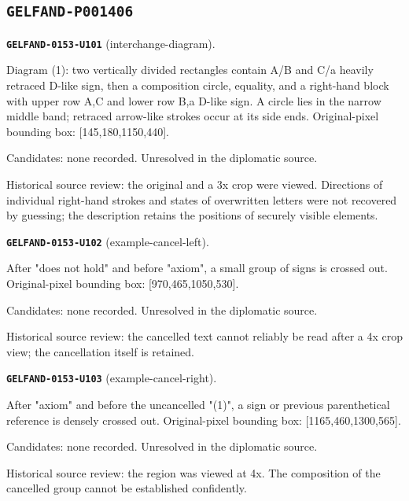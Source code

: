 \subsection*{\texttt{GELFAND-P001406}}
\par\noindent\leavevmode{}\label{GELFAND-0153-U101}\textbf{\texttt{GELFAND-0153-U101}} (interchange-diagram).\nopagebreak[4]\par
Diagram (1): two vertically divided rectangles contain A/B and C/a heavily retraced D-like sign, then a composition circle, equality, and a right-hand block with upper row A,C and lower row B,a D-like sign. A circle lies in the narrow middle band; retraced arrow-like strokes occur at its side ends. Original-pixel bounding box: [145,180,1150,440].\par
Candidates: none recorded. Unresolved in the diplomatic source.\par
Historical source review: the original and a 3x crop were viewed. Directions of individual right-hand strokes and states of overwritten letters were not recovered by guessing; the description retains the positions of securely visible elements.\par\medskip
\par\noindent\leavevmode{}\label{GELFAND-0153-U102}\textbf{\texttt{GELFAND-0153-U102}} (example-cancel-left).\nopagebreak[4]\par
After "does not hold" and before "axiom", a small group of signs is crossed out. Original-pixel bounding box: [970,465,1050,530].\par
Candidates: none recorded. Unresolved in the diplomatic source.\par
Historical source review: the cancelled text cannot reliably be read after a 4x crop view; the cancellation itself is retained.\par\medskip
\par\noindent\leavevmode{}\label{GELFAND-0153-U103}\textbf{\texttt{GELFAND-0153-U103}} (example-cancel-right).\nopagebreak[4]\par
After "axiom" and before the uncancelled "(1)", a sign or previous parenthetical reference is densely crossed out. Original-pixel bounding box: [1165,460,1300,565].\par
Candidates: none recorded. Unresolved in the diplomatic source.\par
Historical source review: the region was viewed at 4x. The composition of the cancelled group cannot be established confidently.\par\medskip
